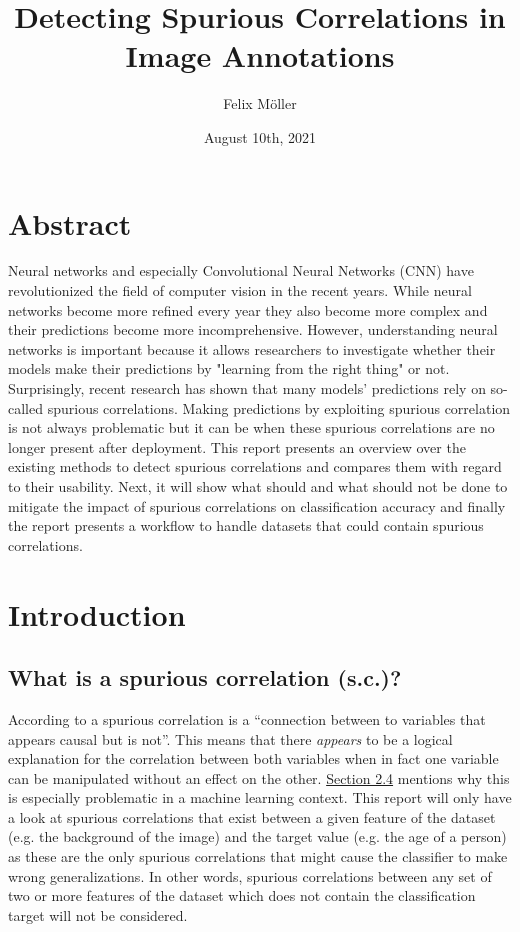 \documentclass{article}
\title{Detecting Spurious Correlations in Image Annotations}
\author{Felix Möller}
\date{August 10th, 2021}
\begin{document}
\maketitle
\tableofcontents
\newpage
\section{Abstract}
Neural networks and especially Convolutional Neural Networks (CNN) have revolutionized the field of computer vision in the recent years.
While neural networks become more refined every year they also become more complex and their predictions become more incomprehensive.
However, understanding neural networks is important because it allows researchers to investigate whether their models make
their predictions by "learning from the right thing" or not. Surprisingly, recent research has shown that many models' predictions
rely on so-called spurious correlations. Making predictions by exploiting spurious correlation is not always problematic but it can be when
these spurious correlations are no longer present after deployment.
This report presents an overview over the existing methods to detect spurious correlations and compares them with regard to their usability.
Next, it will show what should and what should not be done to mitigate the impact of spurious correlations on classification
accuracy and finally the report presents a workflow to handle datasets that could contain spurious correlations. 


\section{Introduction}
\subsection{What is a spurious correlation (s.c.)?}
According to \cite{sc_def} a spurious correlation is a \enquote{connection between to variables that appears causal but is not}.
This means that there \textit{appears} to be a logical explanation for the correlation between both variables when in fact one variable 
can be manipulated without an effect on the other.
\hyperref[sec:challenges]{Section 2.4} mentions why this is especially problematic in a machine learning context.
This report will only have a look at spurious correlations that exist between a given feature of the dataset (e.g. the background of the image)
and the target value (e.g. the age of a person) as these are the only spurious correlations that might cause the classifier to make wrong generalizations.
In other words, spurious correlations between any set of two or more features of the dataset which does not contain the classification
target will not be considered.
\end{document}
